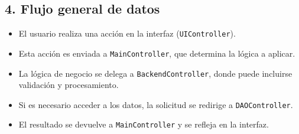 \vspace{5ex}

\subsection*{4. Flujo general de datos}
\begin{itemize}
    \item El usuario realiza una acción en la interfaz (\texttt{UIController}).
    \item Esta acción es enviada a \texttt{MainController}, que determina la lógica a aplicar.
    \item La lógica de negocio se delega a \texttt{BackendController}, donde puede incluirse validación y procesamiento.
    \item Si es necesario acceder a los datos, la solicitud se redirige a \texttt{DAOController}.
    \item El resultado se devuelve a \texttt{MainController} y se refleja en la interfaz.
\end{itemize}

\newpage

